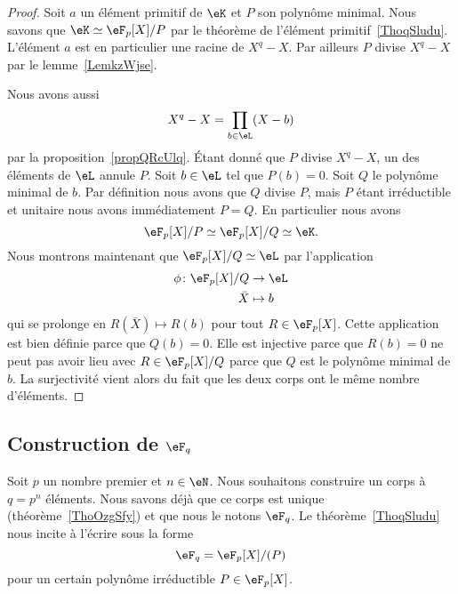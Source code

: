 \begin{proof}
    Soit \( a\) un élément primitif de \( \eK\) et \( P\) son polynôme minimal. Nous savons que \( \eK\simeq \eF_p[X]/P\) par le théorème de l'élément primitif~\ref{ThoqSludu}. L'élément \( a\) est en particulier une racine de \( X^q-X\). Par ailleurs \( P\) divise \( X^q-X\) par le lemme~\ref{LemkzWjse}.

    Nous avons aussi
    \begin{equation}
        X^q-X=\prod_{b\in \eL}(X-b)
    \end{equation}
    par la proposition~\ref{propQRcUlq}. Étant donné que \( P\) divise \( X^q-X\), un des éléments de \( \eL\) annule \( P\). Soit \( b\in \eL\) tel que \( P(b)=0\). Soit \( Q\) le polynôme minimal de \( b\). Par définition nous avons que \( Q\) divise \( P\), mais \( P\) étant irréductible et unitaire nous avons immédiatement \( P=Q\). En particulier nous avons
    \begin{equation}
        \eF_p[X]/P\simeq\eF_p[X]/Q\simeq \eK.
    \end{equation}
    Nous montrons maintenant que \( \eF_p[X]/Q\simeq \eL\) par l'application
    \begin{equation}
        \begin{aligned}
            \phi\colon \eF_p[X]/Q&\to \eL \\
            \bar X&\mapsto b
        \end{aligned}
    \end{equation}
    qui se prolonge en \( R(\bar X)\mapsto R(b)\) pour tout \( R\in \eF_p[X]\). Cette application est bien définie parce que \( Q(b)=0\). Elle est injective parce que \( R(b)=0\) ne peut pas avoir lieu avec \( R\in \eF_p[X]/Q\) parce que \( Q\) est le polynôme minimal de \( b\). La surjectivité vient alors du fait que les deux corps ont le même nombre d'éléments.
\end{proof}

\subsection{Construction de $\eF_q$}

Soit \( p\) un nombre premier et \( n\in \eN\). Nous souhaitons construire un corps à \( q=p^n\) éléments. Nous savons déjà que ce corps est unique (théorème~\ref{ThoOzgSfy}) et que nous le notons \( \eF_q\). Le théorème~\ref{ThoqSludu} nous incite à l'écrire sous la forme
\begin{equation}
    \eF_q=\eF_p[X]/(P)
\end{equation}
pour un certain polynôme irréductible \( P\in\eF_p[X]\).

